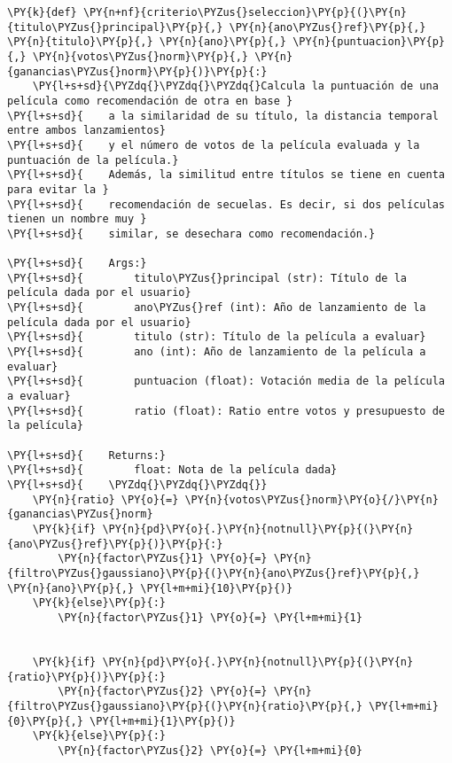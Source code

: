     \begin{tcolorbox}[breakable, size=fbox, boxrule=1pt, pad at break*=1mm,colback=cellbackground, colframe=cellborder]
\begin{Verbatim}[commandchars=\\\{\}]
\PY{k}{def} \PY{n+nf}{criterio\PYZus{}seleccion}\PY{p}{(}\PY{n}{titulo\PYZus{}principal}\PY{p}{,} \PY{n}{ano\PYZus{}ref}\PY{p}{,} \PY{n}{titulo}\PY{p}{,} \PY{n}{ano}\PY{p}{,} \PY{n}{puntuacion}\PY{p}{,} \PY{n}{votos\PYZus{}norm}\PY{p}{,} \PY{n}{ganancias\PYZus{}norm}\PY{p}{)}\PY{p}{:}
    \PY{l+s+sd}{\PYZdq{}\PYZdq{}\PYZdq{}Calcula la puntuación de una película como recomendación de otra en base }
\PY{l+s+sd}{    a la similaridad de su título, la distancia temporal entre ambos lanzamientos}
\PY{l+s+sd}{    y el número de votos de la película evaluada y la puntuación de la película.}
\PY{l+s+sd}{    Además, la similitud entre títulos se tiene en cuenta para evitar la }
\PY{l+s+sd}{    recomendación de secuelas. Es decir, si dos películas tienen un nombre muy }
\PY{l+s+sd}{    similar, se desechara como recomendación.}

\PY{l+s+sd}{    Args:}
\PY{l+s+sd}{        titulo\PYZus{}principal (str): Título de la película dada por el usuario}
\PY{l+s+sd}{        ano\PYZus{}ref (int): Año de lanzamiento de la película dada por el usuario}
\PY{l+s+sd}{        titulo (str): Título de la película a evaluar}
\PY{l+s+sd}{        ano (int): Año de lanzamiento de la película a evaluar}
\PY{l+s+sd}{        puntuacion (float): Votación media de la película a evaluar}
\PY{l+s+sd}{        ratio (float): Ratio entre votos y presupuesto de la película}

\PY{l+s+sd}{    Returns:}
\PY{l+s+sd}{        float: Nota de la película dada}
\PY{l+s+sd}{    \PYZdq{}\PYZdq{}\PYZdq{}}
    \PY{n}{ratio} \PY{o}{=} \PY{n}{votos\PYZus{}norm}\PY{o}{/}\PY{n}{ganancias\PYZus{}norm}
    \PY{k}{if} \PY{n}{pd}\PY{o}{.}\PY{n}{notnull}\PY{p}{(}\PY{n}{ano\PYZus{}ref}\PY{p}{)}\PY{p}{:}
        \PY{n}{factor\PYZus{}1} \PY{o}{=} \PY{n}{filtro\PYZus{}gaussiano}\PY{p}{(}\PY{n}{ano\PYZus{}ref}\PY{p}{,} \PY{n}{ano}\PY{p}{,} \PY{l+m+mi}{10}\PY{p}{)}
    \PY{k}{else}\PY{p}{:}
        \PY{n}{factor\PYZus{}1} \PY{o}{=} \PY{l+m+mi}{1}        

        
    \PY{k}{if} \PY{n}{pd}\PY{o}{.}\PY{n}{notnull}\PY{p}{(}\PY{n}{ratio}\PY{p}{)}\PY{p}{:}
        \PY{n}{factor\PYZus{}2} \PY{o}{=} \PY{n}{filtro\PYZus{}gaussiano}\PY{p}{(}\PY{n}{ratio}\PY{p}{,} \PY{l+m+mi}{0}\PY{p}{,} \PY{l+m+mi}{1}\PY{p}{)}
    \PY{k}{else}\PY{p}{:}
        \PY{n}{factor\PYZus{}2} \PY{o}{=} \PY{l+m+mi}{0}
        

\end{Verbatim}
\end{tcolorbox}
